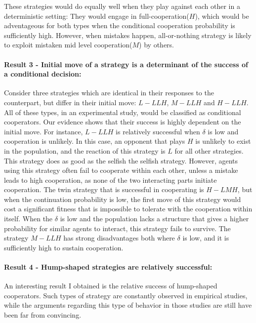 \documentclass[12pt]{article}
\begin{document}
These strategies would do equally well when they play against each other in a deterministic setting: They would engage in full-cooperation($H$), which would be adventageous for both types when the conditional cooperation probability is sufficiently high.  However, when mistakes happen, all-or-nothing strategy is likely to exploit mistaken mid level cooperation($M$) by others.

\paragraph{Result 3 - Initial move of a strategy is a determinant of the success of a conditional decision:}
Consider three strategies which are identical in their responses to the counterpart, but differ in their initial move: $L-LLH$, $M-LLH$ and $H-LLH$.  All of these types, in an experimental study, would be classified as conditional cooperators. Our evidence shows that their success is highly dependent on the initial move. For instance, $L-LLH$ is relatively successful when $\delta$ is low and cooperation is unlikely. In this case, an opponent that plays $H$ is unlikely to exist in the population, and the reaction of this strategy is $L$ for all other strategies. This strategy does as good as the selfish the selfish strategy. However, agents using this strategy often fail to cooperate within each other, unless a mistake leads to high cooperation, as none of the two interacting parts initiate cooperation. The twin strategy that is successful in cooperating is $H-LMH$, but when the continuation probability is low, the first move of this strategy would cost a significant fitness that is impossible to tolerate with the cooperation within itself. When the $\delta$ is low and the  population lacks a structure that gives a higher probability for similar agents to interact, this strategy fails to survive. The strategy $M-LLH$  has strong disadvantages both where $\delta$ is low, and it is sufficiently high to sustain cooperation. 


\paragraph{Result 4 - Hump-shaped strategies are relatively successful:}
An interesting result I obtained is the relative success of hump-shaped cooperators. Such types of strategy are constantly observed in empirical studies, while the arguments regarding this type of behavior in those studies are still have been far from convincing. 
\end{document}
